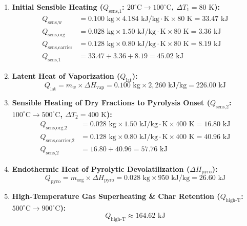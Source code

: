 \documentclass[10pt,twocolumn,a4paper]{article}
\begin{document}
\begin{enumerate}[leftmargin=*]
    \item \textbf{Initial Sensible Heating ($Q_{\text{sens,1}}$: $20^\circ\text{C} \rightarrow 100^\circ\text{C}$, $\Delta T_1 = 80\text{ K}$):}
    \begin{align}
    Q_{\text{sens,w}} &= 0.100\text{ kg} \times 4.184\text{ kJ/kg}\cdot\text{K} \times 80\text{ K} = 33.47\text{ kJ} \\
    Q_{\text{sens,org}} &= 0.028\text{ kg} \times 1.50\text{ kJ/kg}\cdot\text{K} \times 80\text{ K} = 3.36\text{ kJ} \\
    Q_{\text{sens,carrier}} &= 0.128\text{ kg} \times 0.80\text{ kJ/kg}\cdot\text{K} \times 80\text{ K} = 8.19\text{ kJ} \\
    Q_{\text{sens,1}} &= 33.47 + 3.36 + 8.19 = 45.02\text{ kJ}
    \end{align}

    \item \textbf{Latent Heat of Vaporization ($Q_{\text{lat}}$):}
    \begin{equation}
    Q_{\text{lat}} = m_w \times \Delta H_{\text{vap}} = 0.100\text{ kg} \times 2,260\text{ kJ/kg} = 226.00\text{ kJ}
    \end{equation}

    \item \textbf{Sensible Heating of Dry Fractions to Pyrolysis Onset ($Q_{\text{sens,2}}$: $100^\circ\text{C} \rightarrow 500^\circ\text{C}$, $\Delta T_2 = 400\text{ K}$):}
    \begin{align}
    Q_{\text{sens,org,2}} &= 0.028\text{ kg} \times 1.50\text{ kJ/kg}\cdot\text{K} \times 400\text{ K} = 16.80\text{ kJ} \\
    Q_{\text{sens,carrier,2}} &= 0.128\text{ kg} \times 0.80\text{ kJ/kg}\cdot\text{K} \times 400\text{ K} = 40.96\text{ kJ} \\
    Q_{\text{sens,2}} &= 16.80 + 40.96 = 57.76\text{ kJ}
    \end{align}

    \item \textbf{Endothermic Heat of Pyrolytic Devolatilization ($\Delta H_{\text{pyro}}$):}
    \begin{equation}
    Q_{\text{pyro}} = m_{\text{org}} \times \Delta H_{\text{pyro}} = 0.028\text{ kg} \times 950\text{ kJ/kg} = 26.60\text{ kJ}
    \end{equation}

    \item \textbf{High-Temperature Gas Superheating \& Char Retention ($Q_{\text{high-T}}$: $500^\circ\text{C} \rightarrow 900^\circ\text{C}$):}
    \begin{equation}
    Q_{\text{high-T}} \approx 164.62\text{ kJ}
    \end{equation}
\end{enumerate}
\end{document}
